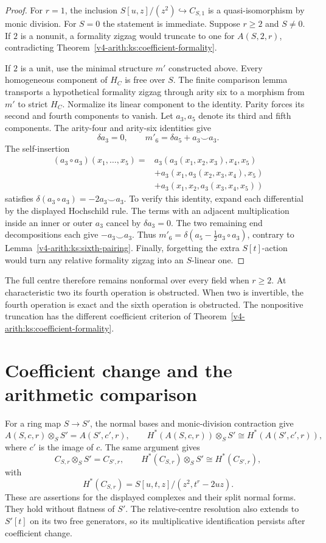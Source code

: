 \begin{proof}
For $r=1$, the inclusion $S[u,z]/(z^2)\hookrightarrow C_{S,1}$
is a quasi-isomorphism by monic division.
For $S=0$ the statement is immediate.
Suppose $r\geq2$ and $S\ne0$.
If $2$ is a nonunit, a formality zigzag would truncate to one for
$A(S,2,r)$, contradicting Theorem~\ref{v4-arith:ks:coefficient-formality}.

If $2$ is a unit, use the minimal structure $m'$ constructed above.
Every homogeneous component of $H_C$ is free over $S$.
The finite comparison lemma transports a hypothetical formality zigzag
through arity six to a morphism from $m'$ to strict $H_C$.
Normalize its linear component to the identity.
Parity forces its second and fourth components to vanish.
Let $a_3,a_5$ denote its third and fifth components.
The arity-four and arity-six identities give
\[
 \delta a_3=0,\qquad m'_6=\delta a_5+a_3\smile a_3.
\]
The self-insertion
\[
 \begin{split}
 (a_3\circ a_3)(x_1,\ldots,x_5)={}&a_3(a_3(x_1,x_2,x_3),x_4,x_5)\\
 &+a_3(x_1,a_3(x_2,x_3,x_4),x_5)\\
 &+a_3(x_1,x_2,a_3(x_3,x_4,x_5))
 \end{split}
\]
satisfies $\delta(a_3\circ a_3)=-2a_3\smile a_3$.
To verify this identity, expand each differential by the displayed Hochschild rule.
The terms with an adjacent multiplication inside an inner or outer $a_3$
cancel by $\delta a_3=0$.
The two remaining end decompositions each give $-a_3\smile a_3$.
Thus $m'_6=\delta(a_5-\tfrac12a_3\circ a_3)$,
contrary to Lemma~\ref{v4-arith:ks:sixth-pairing}.
Finally, forgetting the extra $S[t]$-action would turn any relative
formality zigzag into an $S$-linear one.
\end{proof}

The full centre therefore remains nonformal over every field when $r\geq2$.
At characteristic two its fourth operation is obstructed.
When two is invertible, the fourth operation is exact and the sixth operation is obstructed.
The nonpositive truncation has the different coefficient criterion of
Theorem~\ref{v4-arith:ks:coefficient-formality}.

\section{Coefficient change and the arithmetic comparison}
\label{v4-arith:ks:coefficient-change}

For a ring map $S\to S'$, the normal bases and monic-division contraction give
\[
 A(S,c,r)\otimes_S S'=A(S',c',r),\qquad
 H^*(A(S,c,r))\otimes_S S'\cong H^*(A(S',c',r)),
\]
where $c'$ is the image of $c$.
The same argument gives
\[
 C_{S,r}\otimes_S S'=C_{S',r},\qquad
 H^*(C_{S,r})\otimes_S S'\cong H^*(C_{S',r}),
\]
with
\[
 H^*(C_{S,r})=S[u,t,z]/(z^2,t^r-2uz).
\]
These are assertions for the displayed complexes and their split normal forms.
They hold without flatness of $S'$.
The relative-centre resolution also extends to $S'[t]$ on its two free generators,
so its multiplicative identification persists after coefficient change.

